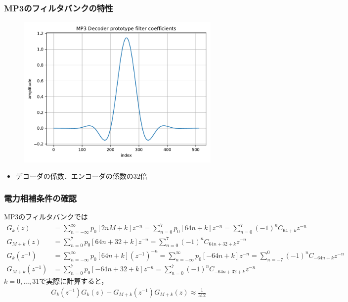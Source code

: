\documentclass[14pt,xcolor=dvipsnames,table,dvipdfmx]{beamer}
\begin{document}
\begin{frame}[c]
    \frametitle{MP3のフィルタバンクの特性}
    \vspace{-5pt}
    \begin{figure}
        \includegraphics[width=100mm]{./figs/mp3_decoder_prototype_filter_coef.pdf}
    \end{figure}
    \vspace{-5pt}
    \begin{itemize}
        \item デコーダの係数．エンコーダの係数の$32$倍
    \end{itemize}
\end{frame}

\begin{frame}[c]
    \frametitle{電力相補条件の確認}
    MP3のフィルタバンクでは
    \scriptsize
    \begin{align*}
        G_{k}(z) &= \sum_{n = -\infty}^{\infty} p_{0}[2nM + k] z^{-n} = \sum_{n = 0}^{7} p_{0}[64n + k] z^{-n} = \sum_{n = 0}^{7} (-1)^{n} C_{64 + k} z^{-n} \\
        G_{M+k}(z) &= \sum_{n = 0}^{7} p_{0}[64n + 32 + k] z^{-n} = \sum_{n = 0}^{7} (-1)^{n} C_{64n + 32 + k} z^{-n} \\
        G_{k}(z^{-1}) &= \sum_{n = -\infty}^{\infty} p_{0}[64n + k] (z^{-1})^{-n} = \sum_{n = -\infty}^{\infty} p_{0}[-64n + k] z^{-n} = \sum_{n = -7}^{0} (-1)^{n} C_{-64n + k} z^{-n} \\
        G_{M+k}(z^{-1}) &= \sum_{n = 0}^{7} p_{0}[-64n + 32 + k] z^{-n} = \sum_{n = 0}^{7} (-1)^{n} C_{-64n + 32 + k} z^{-n}
    \end{align*}
    \normalsize
    $k = 0, ..., 31$で実際に計算すると，
    \begin{align*}
        G_{k}(z^{-1})G_{k}(z) + G_{M+k}(z^{-1})G_{M+k}(z) \approx \frac{1}{512}
    \end{align*}
\end{frame}
\end{document}

